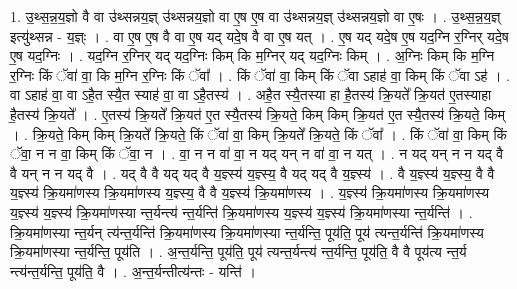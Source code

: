 \documentclass[17pt]{extarticle}
\begin{document}
1. उ॒थ्स॒न्न॒य॒ज्ञो वै वा उ॑थ्सन्नय॒ज्ञ् उ॑थ्सन्नय॒ज्ञो वा ए॒ष ए॒ष वा उ॑थ्सन्नय॒ज्ञ् उ॑थ्सन्नय॒ज्ञो वा ए॒षः । . उ॒थ्स॒न्न॒य॒ज्ञ् इत्यु॑थ्सन्न - य॒ज्ञ्ः । . वा ए॒ष ए॒ष वै वा ए॒ष यद् यदे॒ष वै वा ए॒ष यत् । . ए॒ष यद् यदे॒ष ए॒ष यद॒ग्नि र॒ग्निर् यदे॒ष ए॒ष यद॒ग्निः । . यद॒ग्नि र॒ग्निर् यद् यद॒ग्निः किम् कि म॒ग्निर् यद् यद॒ग्निः किम् । . अ॒ग्निः किम् कि म॒ग्नि र॒ग्निः किं ॅवा॑ वा॒ कि म॒ग्नि र॒ग्निः किं ॅवा᳚ । . किं ॅवा॑ वा॒ किम् किं ॅवा ऽहाह॑ वा॒ किम् किं ॅवा ऽह॑ । . वा ऽहाह॑ वा॒ वा ऽहै॒त स्यै॒त स्याह॑ वा॒ वा ऽहै॒तस्य॑ । . अहै॒त स्यै॒तस्या हा है॒तस्य॑ क्रि॒यते᳚ क्रि॒यत॑ ए॒तस्याहा है॒तस्य॑ क्रि॒यते᳚ । . ए॒तस्य॑ क्रि॒यते᳚ क्रि॒यत॑ ए॒त स्यै॒तस्य॑ क्रि॒यते॒ किम् किम् क्रि॒यत॑ ए॒त स्यै॒तस्य॑ क्रि॒यते॒ किम् । . क्रि॒यते॒ किम् किम् क्रि॒यते᳚ क्रि॒यते॒ किं ॅवा॑ वा॒ किम् क्रि॒यते᳚ क्रि॒यते॒ किं ॅवा᳚ । . किं ॅवा॑ वा॒ किम् किं ॅवा॒ न न वा॒ किम् किं ॅवा॒ न । . वा॒ न न वा॑ वा॒ न यद् यन् न वा॑ वा॒ न यत् । . न यद् यन् न न यद् वै वै यन् न न यद् वै । . यद् वै वै यद् यद् वै य॒ज्ञ्स्य॑ य॒ज्ञ्स्य॒ वै यद् यद् वै य॒ज्ञ्स्य॑ । . वै य॒ज्ञ्स्य॑ य॒ज्ञ्स्य॒ वै वै य॒ज्ञ्स्य॑ क्रि॒यमा॑णस्य क्रि॒यमा॑णस्य य॒ज्ञ्स्य॒ वै वै य॒ज्ञ्स्य॑ क्रि॒यमा॑णस्य । . य॒ज्ञ्स्य॑ क्रि॒यमा॑णस्य क्रि॒यमा॑णस्य य॒ज्ञ्स्य॑ य॒ज्ञ्स्य॑ क्रि॒यमा॑णस्या न्त॒र्यन्त्य॑ न्त॒र्यन्ति॑ क्रि॒यमा॑णस्य य॒ज्ञ्स्य॑ य॒ज्ञ्स्य॑ क्रि॒यमा॑णस्या न्त॒र्यन्ति॑ । . क्रि॒यमा॑णस्या न्त॒र्यन् त्य॑न्त॒र्यन्ति॑ क्रि॒यमा॑णस्य क्रि॒यमा॑णस्या न्त॒र्यन्ति॒ पूय॑ति॒ पूय॑ त्यन्त॒र्यन्ति॑ क्रि॒यमा॑णस्य क्रि॒यमा॑णस्या न्त॒र्यन्ति॒ पूय॑ति । . अ॒न्त॒र्यन्ति॒ पूय॑ति॒ पूय॑ त्यन्त॒र्यन्त्य॑ न्त॒र्यन्ति॒ पूय॑ति॒ वै वै पूय॑त्य न्त॒र्य न्त्य॑न्त॒र्यन्ति॒ पूय॑ति॒ वै । . अ॒न्त॒र्यन्तीत्य॑न्तः - यन्ति॑ । \newline
\end{document}
